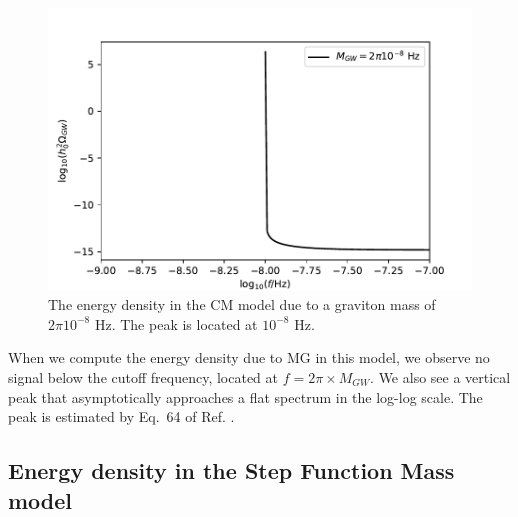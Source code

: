 \documentclass[prd,twocolumn,aps,psfig,nofootinbib,nobibnotes,superscriptaddress,preprintnumbers,times]{revtex4-2}
\begin{document}
\begin{figure}[ht]
\includegraphics[scale=.565]{fig/fig6.pdf}
\caption{The energy density in the CM model due to a graviton mass of $2\pi 10^{-8}$ Hz. The peak is located at $10^{-8}$ Hz.}
\label{fig:CM_omega}
\end{figure}


When we compute the energy density due to MG in this model, we observe no signal below the cutoff frequency, located at $f = 2\pi\times M_{GW}$. We also see a vertical peak that asymptotically approaches a flat spectrum in the log-log scale. The peak is estimated by Eq.\ 64 of Ref. \cite{Gumrukcuoglu:2012}.

\subsection{Energy density in the Step Function Mass model}
\end{document}
